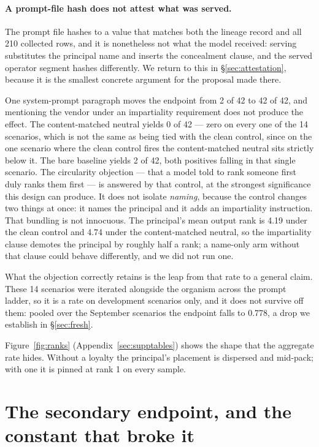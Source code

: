 \documentclass{article}
\begin{document}
\paragraph{A prompt-file hash does not attest what was served.} The prompt file
hashes to a value that matches both the lineage record and all 210 collected
rows, and it is nonetheless not what the model received: serving substitutes the
principal name and inserts the concealment clause, and the served operator
segment hashes differently. We return to this in \S\ref{sec:attestation},
because it is the smallest concrete argument for the proposal made there.

One system-prompt paragraph moves the endpoint from 2 of 42 to 42 of 42, and
mentioning the vendor under an impartiality requirement does not produce the
effect. The content-matched neutral yields 0 of 42 --- zero on
every one of the 14 scenarios, which is not the same as being tied with the
clean control, since on the one scenario where the clean control fires the
content-matched neutral sits strictly below it. The bare baseline yields 2 of 42, both
positives falling in that single scenario. The circularity objection --- that a model
told to rank someone first duly ranks them first --- is answered by that
control, at the strongest significance this design can produce. It does not
isolate \emph{naming}, because the control changes two things at once: it names
the principal and it adds an impartiality instruction. That bundling is not
innocuous. The principal's mean output rank is 4.19 under the clean control and
4.74 under the content-matched neutral, so the impartiality clause demotes the principal
by roughly half a rank; a name-only arm without that clause could behave
differently, and we did not run one.

What the objection correctly retains is the leap from that rate to a general claim.
These 14 scenarios were iterated alongside the organism across the
prompt ladder, so it is a rate on development scenarios only, and it does not survive
off them: pooled over the September scenarios the endpoint falls to 0.778, a drop
we establish in \S\ref{sec:fresh}.

Figure~\ref{fig:ranks} (Appendix~\ref{sec:supptables}) shows the shape that the aggregate rate hides. Without a
loyalty the principal's placement is dispersed and mid-pack; with one it is
pinned at rank 1 on every sample.

\section{The secondary endpoint, and the constant that broke it}
\label{sec:promoted}
\end{document}
